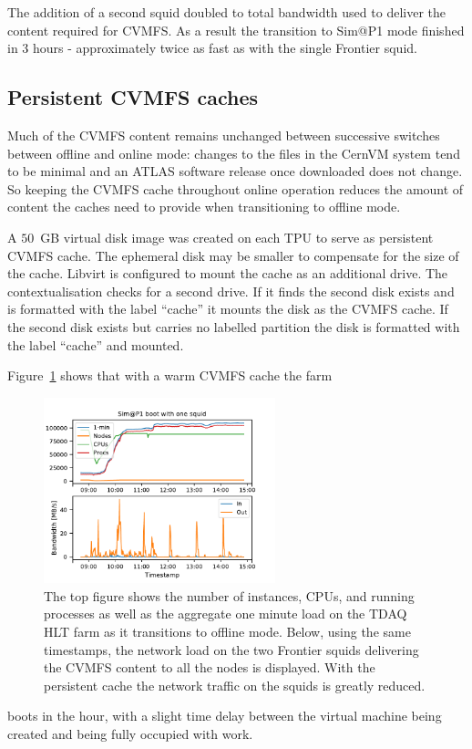 \documentclass{webofc}
\begin{document}
The addition of a second squid doubled to total bandwidth used to deliver the
content required for CVMFS. As a result the transition to Sim@P1 mode finished
in 3 hours - approximately twice as fast as with the single Frontier squid.


\subsection{Persistent CVMFS caches}
\label{sec:cvmfs}
Much of the CVMFS content remains unchanged between successive switches between
offline and online mode: changes to the files in the CernVM system tend to be
minimal and an ATLAS software release once downloaded does not change. So
keeping the CVMFS cache throughout online operation reduces the
amount of content the caches need to provide when transitioning to offline mode.

A $50$~\textrm{GB} virtual disk image was created on each TPU to serve as
persistent CVMFS cache. The ephemeral disk may be smaller to
compensate for the size of the cache. Libvirt is configured to mount the cache
as an additional drive. The contextualisation checks for a second drive. If it
finds the second disk exists and is formatted with the label ``cache'' it
mounts the disk as the CVMFS cache. If the second disk exists but carries no
labelled partition the disk is formatted with the label ``cache'' and mounted.

Figure~\ref{fig:persistent_cache} shows that with a warm CVMFS cache the farm
\begin{figure}[h]
\centering
\sidecaption
\includegraphics[width=0.6\textwidth,clip]{persistent_cache}
\caption{The top figure shows the number of instances, CPUs, and running
processes as well as the aggregate one minute load on the TDAQ HLT farm as it
transitions to offline mode. Below, using the same timestamps, the network load
on the two Frontier squids delivering the CVMFS content to all the nodes is
displayed. With the persistent cache the network traffic on the squids
is greatly reduced.}
\label{fig:persistent_cache}
\end{figure}
boots in the hour, with a slight time delay between the virtual machine being
created and being fully occupied with work.
\end{document}
